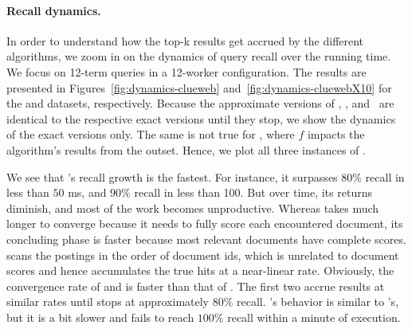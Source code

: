 {{\paragraph{Recall dynamics.} 
In order to understand how the top-k results get accrued by the different algorithms, we zoom in on the dynamics of query 
recall over the running time. We focus on 12-term queries in a 12-worker configuration. The results are presented in 
Figures~\ref{fig:dynamics-clueweb} and~\ref{fig:dynamics-cluewebX10} for the \cw\/ and \cwten\/ datasets, respectively.
Because the approximate versions of \alg, \pRA, and \pJASS\ are  identical to the respective exact versions until they stop, 
we show the dynamics of the exact versions only.  The same is not true for \pBMW, where $f$ impacts the algorithm's results from the outset.
Hence, we plot all three instances of \pBMW. 

We see that \alg's recall growth is the fastest. For instance, it surpasses $80\%$ recall in less than $50$ ms, 
and $90\%$ recall in less than 100. But over time, its returns  diminish, and most of the work becomes unproductive. Whereas
\pRA\/ takes much longer to converge because it needs to fully score each encountered document,  its concluding phase is faster because 
most relevant documents   have complete  scores. 
\pBMW\/ scans the postings in the order of document ids, which is unrelated to document scores and hence accumulates the true hits 
at a near-linear rate. Obviously, the convergence rate of \pBMW\hi\/ and \pBMW\lo\/ is faster than that of \pBMW\ex. The first 
two accrue results at similar rates until \pBMW\lo\/ stops at approximately $80\%$ recall.
\pJASS's behavior  is similar to \alg's, but it is a bit slower and fails to reach $100\%$ recall within a minute of execution.


}}
